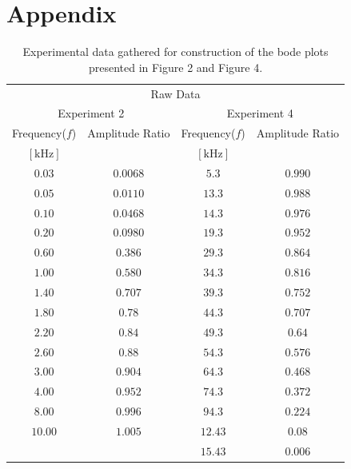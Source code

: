 \documentclass[
	12pt,
	]{article}
\theoremstyle{definition}
\theoremstyle{definition}
\theoremstyle{definition}
\theoremstyle{definition}
\theoremstyle{definition}
\theoremstyle{example}
\theoremstyle{note}
\theoremstyle{remark}
\theoremstyle{example}
\begin{document}
		\appendix
		\section*{Appendix}
		\begin{table}[h]
		\centering
		\caption{
		Experimental data gathered for construction of the bode plots presented in Figure 2 and Figure 4.
		}
		\begin{tabular}{cccc}
		\toprule
		\toprule
		\multicolumn{4}{c}{Raw Data} \\
		\multicolumn{2}{c}{Experiment 2} & \multicolumn{2}{c}{Experiment 4}\\
		\cmidrule(lr){1-2} \cmidrule(l){3-4}
		Frequency($f$) & Amplitude Ratio & Frequency($f$) & Amplitude Ratio\\
		$[\si{\kilo\hertz}]$ & & $[\si{\kilo\hertz}]$ & \\
		\midrule
		$0.03$ & $0.0068$ & $5.3$ & $0.990$ \\
		$0.05$ & $0.0110$ & $13.3$ & $0.988$ \\
		$0.10$ & $0.0468$ & $14.3$ & $0.976$ \\
		$0.20$ & $0.0980$ & $19.3$ & $0.952$ \\
		$0.60$ & $0.386$ & $29.3$ & $0.864$ \\
		$1.00$ & $0.580$ & $34.3$ & $0.816$ \\
		$1.40$ & $0.707$ & $39.3$ & $0.752$ \\
		$1.80$ & $0.78$ & $44.3$ & $0.707$ \\
		$2.20$ & $0.84$ & $49.3$ & $0.64$ \\
		$2.60$ & $0.88$ & $54.3$ & $ 0.576$ \\
		$3.00$ & $0.904$ & $64.3$ & $ 0.468$ \\
		$4.00$ & $0.952$ & $74.3$ & $ 0.372$ \\
		$8.00$ &  $0.996$ & $94.3$ & $0.224$ \\
		$10.00$ & $1.005$ & $12.43$ & $0.08$ \\
		 & & $15.43$ & $0.006$ \\
		\bottomrule
		\bottomrule
		\end{tabular}
		\end{table}
	
\end{document}
